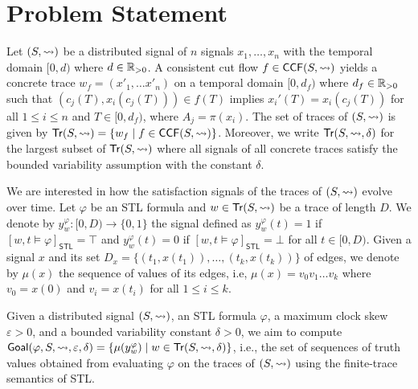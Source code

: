 \section{Problem Statement}
Let $(S,{\rightsquigarrow})$ be a distributed signal of $n$ signals $x_1, \ldots, x_n$ with the temporal domain $[0,d)$ where $d \in \mathbb{R}_{> 0}$.
A consistent cut flow $f \in \mathsf{CCF}(S,{\rightsquigarrow})$ yields a concrete trace $w_f = (x'_1, \ldots x'_n)$ on a temporal domain $[0,d_f)$ where $d_f \in \mathbb{R}_{> 0}$ such that $(c_j(T), x_i(c_j(T))) \in f(T)$ implies $x_i'(T) = x_i(c_j(T))$ for all $1 \leq i \leq n$ and $T \in [0, d_f)$, where $A_j = \pi(x_i)$.
The set of traces of $(S,{\rightsquigarrow})$ is given by $\tr(S,{\hb}) = \{ w_f \st f \in \CCF(S,{\hb})\}$.
Moreover, we write $\mathsf{Tr}(S,{\rightsquigarrow},\delta)$ for the largest subset of $\mathsf{Tr}(S,{\rightsquigarrow})$ where all signals of all concrete traces satisfy the bounded variability assumption with the constant $\delta$. 

We are interested in how the satisfaction signals of the traces of $(S,{\rightsquigarrow})$ evolve over time.
Let $\varphi$ be an STL formula and $w \in \mathsf{Tr}(S,{\rightsquigarrow})$ be a trace of length $D$.
We denote by $y_w^\varphi : [0,D) \to \{0,1\}$ the signal defined as $y_w^\varphi(t) = 1$ if $[w, t \models \varphi]_{\mathsf{STL}} = \top$ and $y_w^\varphi(t) = 0$ if $[w, t \models \varphi]_{\mathsf{STL}} = \bot$ for all $t \in [0,D)$.
Given a signal $x$ and its set $D_x = \{(t_1, x(t_1)), \ldots, (t_k, x(t_k))\}$ of edges, we denote by $\mu(x)$ the sequence of values of its edges, i.e, $\mu(x) = v_0 v_1 \ldots v_k$ where $v_0 = x(0)$ and $v_i = x(t_i)$ for all $1 \leq i \leq k$.

Given a distributed signal $(S, {\rightsquigarrow})$, an STL formula $\varphi$, a maximum clock skew $\varepsilon > 0$, and a bounded variability constant $\delta > 0$, we aim to compute $\mathsf{Goal}(\varphi, S, {\hb}, \varepsilon, \delta) = \{ \mu(y_w^\varphi) \st w \in \tr(S, {\hb}, \delta) \}$, i.e., the set of sequences of truth values obtained from evaluating $\varphi$ on the traces of $(S, {\rightsquigarrow})$ using the finite-trace semantics of STL.
